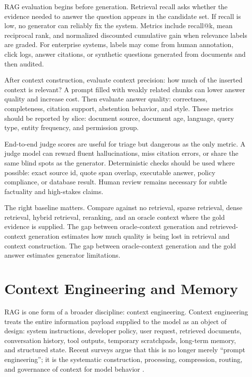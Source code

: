 RAG evaluation begins before generation. Retrieval recall asks whether the evidence needed to answer the question appears in the candidate set. If recall is low, no generator can reliably fix the system. Metrics include recall@k, mean reciprocal rank, and normalized discounted cumulative gain when relevance labels are graded. For enterprise systems, labels may come from human annotation, click logs, answer citations, or synthetic questions generated from documents and then audited.

After context construction, evaluate context precision: how much of the inserted context is relevant? A prompt filled with weakly related chunks can lower answer quality and increase cost. Then evaluate answer quality: correctness, completeness, citation support, abstention behavior, and style. These metrics should be reported by slice: document source, document age, language, query type, entity frequency, and permission group.

End-to-end judge scores are useful for triage but dangerous as the only metric. A judge model can reward fluent hallucinations, miss citation errors, or share the same blind spots as the generator. Deterministic checks should be used where possible: exact source id, quote span overlap, executable answer, policy compliance, or database result. Human review remains necessary for subtle factuality and high-stakes claims.

The right baseline matters. Compare against no retrieval, sparse retrieval, dense retrieval, hybrid retrieval, reranking, and an oracle context where the gold evidence is supplied. The gap between oracle-context generation and retrieved-context generation estimates how much quality is being lost in retrieval and context construction. The gap between oracle-context generation and the gold answer estimates generator limitations.

\section{Context Engineering and Memory}
\label{sec:context-engineering-memory}

RAG is one form of a broader discipline: context engineering. Context engineering treats the entire information payload supplied to the model as an object of design: system instructions, developer policy, user request, retrieved documents, conversation history, tool outputs, temporary scratchpads, long-term memory, and structured state. Recent surveys argue that this is no longer merely ``prompt engineering''; it is the systematic construction, processing, compression, routing, and governance of context for model behavior \cite{mei2025context}.

